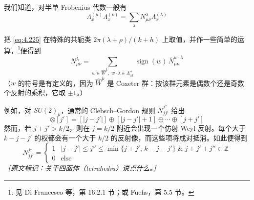 我们知道，对半单 Frobenius 代数一般有
\begin{equation}
  \Lambda^{(\mu)}_x\Lambda^{(\nu)}_x=\sum_\lambda N^{\lambda}_{\mu\nu}\Lambda^{(\lambda)}_x
  \tag{4.226}
  \label{eq:4.226}
\end{equation}

把 \eqref{eq:4.225} 在特殊的共轭类 $2\pi(\lambda+\rho)/(k+h)$ 上取值，并作一些简单的运算，\footnote{见 Di Francesco 等，第 16.2.1 节；或 Fuchs，第 5.5 节。}便得到
\begin{equation}
  N^{\lambda}_{\mu\nu}=\sum_{w\in\widehat{W}^{k},\;w\cdot\lambda\in\Lambda^{+}_{wt}}\operatorname{sign}(w)\,\bar N^{w\cdot\lambda}_{\mu\nu}
  \tag{4.227}
  \label{eq:4.227}
\end{equation}
（$w$ 的符号是有定义的，因为 $\widehat{W}^{k}$ 是 Coxeter 群：按该群元素是偶数个还是奇数个反射的乘积，它取 $\pm1$。）

例如，对 $SU(2)_k$，通常的 Clebsch–Gordon 规则 $\bar N^{j''}_{jj'}$ 给出
\begin{equation}
  [j]\otimes[j']=[|j-j'|]\oplus[|j-j'|+1]\oplus\cdots\oplus[j+j']
  \tag{4.228}
  \label{eq:4.228}
\end{equation}
然而，若 $j+j'>k/2$，则在 $j=k/2$ 附近会出现一个仿射 Weyl 反射。每个大于 $k-j-j'$ 的权都会有一个大于 $k/2$ 的反射像，而这些项将成对抵消。如此便得到
\begin{equation}
  N^{j''}_{jj'}=
  \begin{cases}
    1 & |j-j'|\le j''\le\min\{j+j',\,k-j-j'\}\;\&\;j+j'+j''\in\mathbb{Z}\\
    0 & \text{else}
  \end{cases}
  \tag{4.229}
  \label{eq:4.229}
\end{equation}
{\small\itshape ［原文标记：关于四面体（tetrahedra）说点什么。］}

